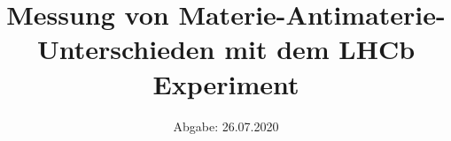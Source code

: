 

\subject{Praktikumsversuch im SS2020}
\title{Messung von Materie-Antimaterie-Unterschieden mit dem LHCb Experiment}
\date{%
  Abgabe: 26.07.2020
}



\maketitle
\thispagestyle{empty}
\tableofcontents
\newpage








%


